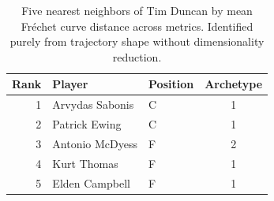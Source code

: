 \begin{table}[htbp]
  \centering\small
  \begin{tabular}{rllc}
    \toprule
    Rank & Player & Position & Archetype \\
    \midrule
    1 & Arvydas Sabonis & C & 1 \\
    2 & Patrick Ewing & C & 1 \\
    3 & Antonio McDyess & F & 2 \\
    4 & Kurt Thomas & F & 1 \\
    5 & Elden Campbell & F & 1 \\
    \bottomrule
  \end{tabular}
  \caption{Five nearest neighbors of Tim Duncan by mean Fr\'{e}chet curve distance across metrics. Identified purely from trajectory shape without dimensionality reduction.}
  \label{tab:Tim_Duncan_frechet_curve_neighbors}
\end{table}

